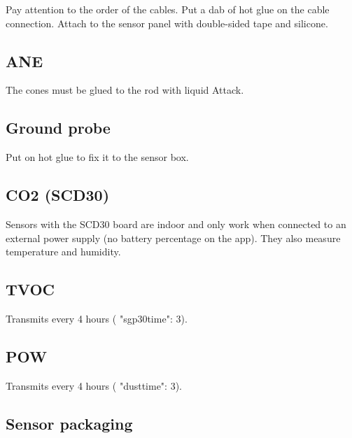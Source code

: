 Pay attention to the order of the cables.
Put a dab of hot glue on the cable connection.
Attach to the sensor panel with double-sided tape and silicone.

\subsection{ANE}

The cones must be glued to the rod with liquid Attack.

\subsection{Ground probe}

Put on hot glue to fix it to the sensor box.

\subsection{CO2 (SCD30)}

Sensors with the SCD30 board are indoor and only work when connected to an external power supply (no battery percentage on the app). They also measure temperature and humidity.

\subsection{TVOC}


Transmits every 4 hours ( "sgp30time": 3).

\subsection{POW}

Transmits every 4 hours ( "dusttime": 3).

\subsection{Sensor packaging}

